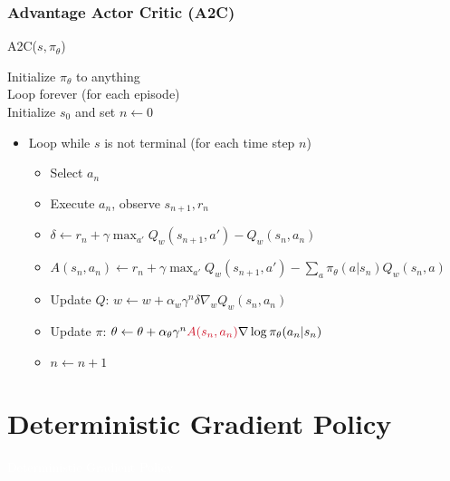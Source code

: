 \documentclass[11pt,table]{beamer}
\begin{document}
\begin{frame}
\frametitle{Advantage Actor Critic (A2C)}

\begin{tcolorbox}[colframe=black, boxrule=1pt, sharp corners]

\textcolor{red1}{A2C($s, \pi_\theta$)}

Initialize \( \pi_\theta \) to anything\\
Loop forever (for each episode)\\
Initialize \( s_0 \) and set \( n \leftarrow 0 \)
\begin{itemize}
    \item[] Loop while \( s \) is not terminal (for each time step \( n \))
    \begin{itemize}
        \item[] Select \( a_n \)
        \item[] Execute \( a_n \), observe \( s_{n+1}, r_n \)
        \item[] \( \delta \leftarrow r_n + \gamma \max_{a'} Q_w(s_{n+1}, a') - Q_w(s_n, a_n) \)
        \item[] \textcolor{red1}{\( A(s_n, a_n) \leftarrow r_n + \gamma \max_{a'} Q_w(s_{n+1}, a') - \sum_a \pi_\theta(a|s_n) Q_w(s_n, a) \)}
        \item[] Update \( Q \): \( w \leftarrow w + \alpha_w \gamma^n \delta \nabla_w Q_w(s_n, a_n) \)
        \item[] Update \( \pi \): \( \theta \leftarrow \theta + \alpha_\theta \gamma^n \textcolor{red1}{A(s_n, a_n)} \nabla \log \pi_\theta(a_n|s_n) \)
        \item[] \( n \leftarrow n + 1 \)
    \end{itemize}
\end{itemize}

\end{tcolorbox}

\end{frame}


\section{Deterministic Gradient Policy}
{
\begin{frame}
\centering
\Huge
\textcolor{white}{Deterministic Gradient Policy}
\thispagestyle{empty}
\end{frame}
}
\end{document}
